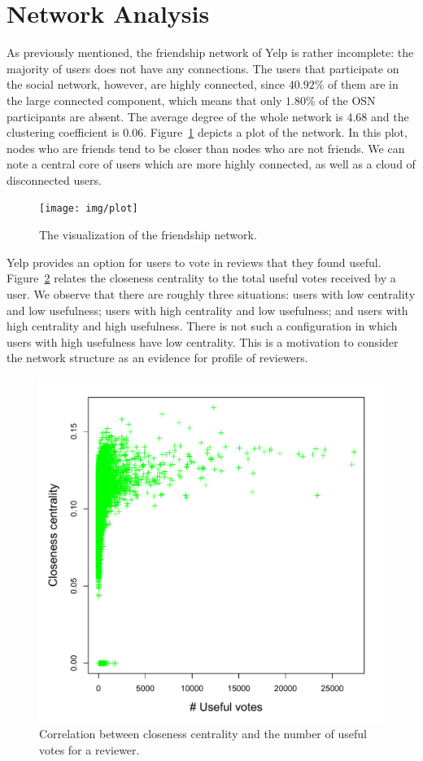\section{Network Analysis}
As previously mentioned, the friendship network of Yelp is rather incomplete:
the majority of users does not have any connections. The users that participate
on the social network, however, are highly connected, since $40.92$\% of them
are in the large connected component, which means that only $1.80$\% of the OSN
participants are absent. The average degree of the whole network is $4.68$ and
the clustering coefficient is $0.06$. Figure~\ref{fig:plot} depicts a plot of the
network. In this plot, nodes who are friends tend to be closer than nodes who are
not friends. We can note a central core of users which are more highly connected, as well
as a cloud of disconnected users.

\begin{figure}[H]
\centering
\texttt{[image: img/plot]}
\caption{The visualization of the friendship network.}
\label{fig:plot}
\end{figure}

Yelp provides an option for users to vote in reviews that they found useful.
Figure~\ref{fig:clo_use} relates the closeness centrality to the total useful
votes received by a user. We observe that there are roughly three situations:
users with low centrality and low usefulness; users with high centrality and low
usefulness; and users with high centrality and high usefulness. There is not
such a configuration in which users with high usefulness have low centrality.
This is a motivation to consider the network structure as an evidence for
profile of reviewers.

\begin{figure}[H]
\centering
\includegraphics[scale=0.5]{img/close_useful_scatter}
\caption{Correlation between closeness centrality and the number of useful votes for a reviewer.}
\label{fig:clo_use}
\end{figure}

